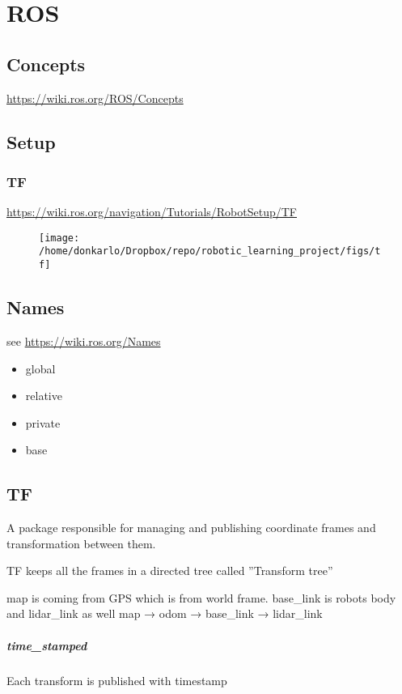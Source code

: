 \chapter{ROS}

\section{Concepts}
\url{https://wiki.ros.org/ROS/Concepts}

\section{Setup}
    \subsection{TF}
        \url{https://wiki.ros.org/navigation/Tutorials/RobotSetup/TF}
        \begin{figure}
            \centering
            \texttt{[image: /home/donkarlo/Dropbox/repo/robotic\_learning\_project/figs/tf]}
            \caption{}
            \label{fig:tf}
        \end{figure}
\section{Names}
    see \url{https://wiki.ros.org/Names}
    \begin{itemize}
        \item global
        \item relative
        \item private
        \item base
    \end{itemize}

\section{TF}
    A package responsible for managing and publishing coordinate frames and transformation between them.
    
    TF keeps all the frames in a directed tree called ''Transform tree''
    
    
    map is coming from GPS which is from world frame. base\_link is robots body and lidar\_link as well
    map → odom → base\_link → lidar\_link
    
    \paragraph{time\_stamped}
        Each transform is published with timestamp
        
